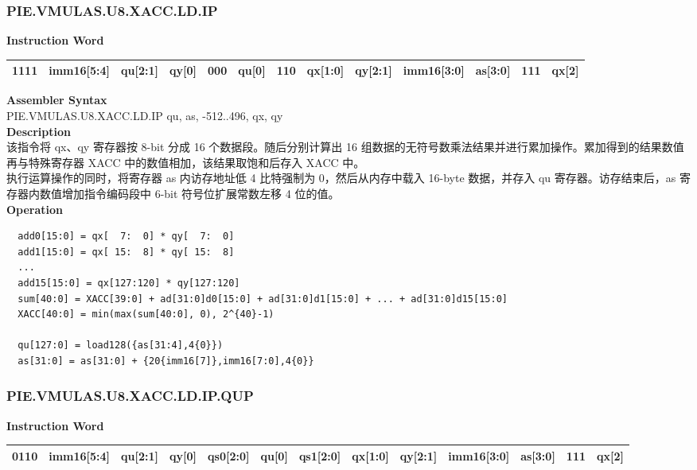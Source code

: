 \newpage
\subsubsection{PIE.VMULAS.U8.XACC.LD.IP}\label{instruction:PIEVMULASU8XACCLDIP}
\setlength\tabcolsep{6pt}
\textbf{Instruction Word} \\
\begin{tabular}{|c|c|c|c|c|c|c|c|c|c|c|c|c|}
	\hline
	1111 & imm16[5:4] & qu[2:1] & qy[0] & 000 & qu[0] & 110 & qx[1:0] & qy[2:1] & imm16[3:0] & as[3:0] & 111 & qx[2] \\
	\hline
\end{tabular}

\textbf{Assembler Syntax} \\
PIE.VMULAS.U8.XACC.LD.IP qu, as, -512..496, qx, qy \\
\textbf{Description} \\
该指令将 qx、qy 寄存器按 8-bit 分成 16 个数据段。随后分别计算出 16 组数据的无符号数乘法结果并进行累加操作。累加得到的结果数值再与特殊寄存器 XACC 中的数值相加，该结果取饱和后存入 XACC 中。\\ 执行运算操作的同时，将寄存器 as 内访存地址低 4 比特强制为 0，然后从内存中载入 16-byte 数据，并存入 qu 寄存器。访存结束后，as 寄存器内数值增加指令编码段中 6-bit 符号位扩展常数左移 4 位的值。\\
\textbf{Operation}
\begin{lstlisting}
  add0[15:0] = qx[  7:  0] * qy[  7:  0]
  add1[15:0] = qx[ 15:  8] * qy[ 15:  8]
  ...
  add15[15:0] = qx[127:120] * qy[127:120]
  sum[40:0] = XACC[39:0] + ad[31:0]d0[15:0] + ad[31:0]d1[15:0] + ... + ad[31:0]d15[15:0]
  XACC[40:0] = min(max(sum[40:0], 0), 2^{40}-1)

  qu[127:0] = load128({as[31:4],4{0}})
  as[31:0] = as[31:0] + {20{imm16[7]},imm16[7:0],4{0}}
\end{lstlisting}

\newpage
\subsubsection{PIE.VMULAS.U8.XACC.LD.IP.QUP}\label{instruction:PIEVMULASU8XACCLDIPQUP}
\setlength\tabcolsep{5pt}
\textbf{Instruction Word} \\
\begin{tabular}{|c|c|c|c|c|c|c|c|c|c|c|c|c|}
	\hline
	0110 & imm16[5:4] & qu[2:1] & qy[0] & qs0[2:0] & qu[0] & qs1[2:0] & qx[1:0] & qy[2:1] & imm16[3:0] & as[3:0] & 111 & qx[2] \\
	\hline
\end{tabular}

